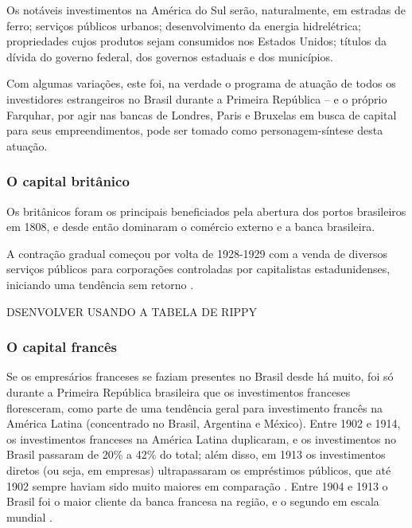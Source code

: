 \begin{citacao}
Os notáveis investimentos na América do Sul serão, naturalmente, em estradas de ferro; serviços públicos urbanos; desenvolvimento da energia hidrelétrica; propriedades cujos produtos sejam consumidos nos Estados Unidos; títulos da dívida do governo federal, dos governos estaduais e dos municípios. \cite[p.~398]{farquhar_invest_1916}
\end{citacao}

Com algumas variações, este foi, na verdade o programa de atuação de todos os investidores estrangeiros no Brasil durante a Primeira República -- e o próprio Farquhar, por agir nas bancas de Londres, Paris e Bruxelas em busca de capital para seus empreendimentos, pode ser tomado como personagem-síntese desta atuação.

\subsubsection{O capital britânico}\label{subsubsec:capbrit}

Os britânicos foram os principais beneficiados pela abertura dos portos brasileiros em 1808, e desde então dominaram o comércio externo e a banca brasileira.

A contração gradual começou por volta de 1928-1929 com a venda de diversos serviços públicos para corporações controladas por capitalistas estadunidenses, iniciando uma tendência sem retorno \cite{rippy_britlat_1954}.

DSENVOLVER USANDO A TABELA DE RIPPY

\subsubsection{O capital francês}\label{subsubsec:capfran}

Se os empresários franceses se faziam presentes no Brasil desde há muito, foi só durante a Primeira República brasileira que os investimentos franceses floresceram, como parte de uma tendência geral para investimento francês na América Latina (concentrado no Brasil, Argentina e México). Entre 1902 e 1914, os investimentos franceses na América Latina duplicaram, e os investimentos no Brasil passaram de 20\% a 42\% do total; além disso, em 1913 os investimentos diretos (ou seja, em empresas) ultrapassaram os empréstimos públicos, que até 1902 sempre haviam sido muito maiores em comparação \cite[p~83-84]{mauro_empfran_1999}. Entre 1904 e 1913 o Brasil foi o maior cliente da banca francesa na região, e o segundo em escala mundial \cite{rippy_french_1949}. 


